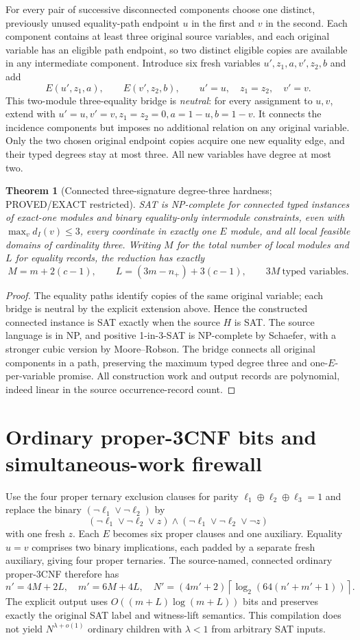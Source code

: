 \documentclass[11pt]{article}
\newtheorem{theorem}{Theorem}
\begin{document}
For every pair of successive disconnected components choose one distinct,
previously unused equality-path endpoint $u$ in the first and $v$ in the
second. Each component contains at least three original source variables,
and each original variable has an eligible path endpoint, so two distinct
eligible copies are available in any intermediate component.
Introduce six fresh variables $u',z_1,a,v',z_2,b$ and add
\[
 E(u',z_1,a),\qquad E(v',z_2,b),\qquad
 u'=u,\quad z_1=z_2,\quad v'=v .
\]
This two-module three-equality bridge is \emph{neutral}: for every
assignment to $u,v$, extend with
$u'=u,v'=v,z_1=z_2=0,a=1-u,b=1-v$.
It connects the incidence components but imposes no additional relation
on any original variable. Only the two chosen original endpoint
copies acquire one new equality edge, and their typed degrees stay
at most three. All new variables have degree at most two.

\begin{theorem}[Connected three-signature degree-three hardness; PROVED/EXACT restricted]
SAT is NP-complete for connected typed instances of exact-one modules
and binary equality-only intermodule constraints, even with
$\max_v d_I(v)\le3$, every coordinate in exactly one $E$ module,
and all local feasible domains of cardinality three.
Writing $M$ for the total number of local modules and $L$ for equality
records, the reduction has exactly
\[
 M=m+2(c-1),\qquad
 L=(3m-n_+)+3(c-1),\qquad 3M\ \text{typed variables}.
\]
\end{theorem}
\begin{proof}
The equality paths identify copies of the same original variable;
each bridge is neutral by the explicit extension above. Hence the
constructed connected instance is SAT exactly when the source $H$
is SAT. The source language is in NP, and positive 1-in-3-SAT is
NP-complete by Schaefer, with a stronger cubic version by
Moore--Robson. The bridge connects all original components in a path,
preserving the maximum typed degree three and one-$E$-per-variable
promise. All construction work and output records are polynomial,
indeed linear in the source occurrence-record count.
\end{proof}

\section{Ordinary proper-3CNF bits and simultaneous-work firewall}
Use the four proper ternary exclusion clauses for parity
$\ell_1\oplus\ell_2\oplus\ell_3=1$ and replace the binary
$(\neg\ell_1\vee\neg\ell_2)$ by
\[
(\neg\ell_1\vee\neg\ell_2\vee z)
\land(\neg\ell_1\vee\neg\ell_2\vee\neg z)
\]
with one fresh $z$. Each $E$ becomes six proper clauses and one
auxiliary. Equality $u=v$ comprises two binary implications, each
padded by a separate fresh auxiliary, giving four proper ternaries.
The source-named, connected ordinary proper-3CNF therefore has
\[
 \boxed{n'=4M+2L,\quad m'=6M+4L,\quad
 N'=(4m'+2)\left\lceil\log_2(64(n'+m'+1))\right\rceil.}
\]
The explicit output uses $O((m+L)\log(m+L))$ bits and preserves exactly
the original SAT label and witness-lift semantics. This compilation
does not yield $N^{\lambda+o(1)}$ ordinary children with $\lambda<1$
from arbitrary SAT inputs.
\end{document}
